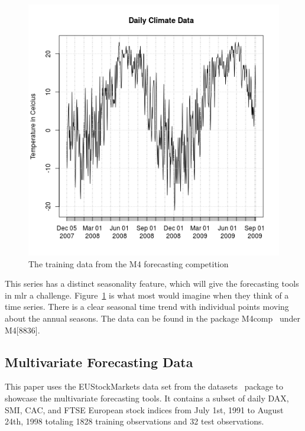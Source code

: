 \documentclass[12pt]{article}\usepackage[]{graphicx}\usepackage[]{color}
\makeatletter
\theoremstyle{definition}
\newcommand\code{\@codex}
\def\@codex#1{{\normalfont\ttfamily\hyphenchar\font=-1 #1}}
\newcommand{\pkg}[1]{{\fontseries{b}\selectfont #1}}
\makeatother
\begin{document}
\begin{figure}[h!]
\includegraphics[width=.8\linewidth]{plot_m4_train.png}
\centering
\caption{The training data from the M4 forecasting competition}
\label{fig:m4_train}
\end{figure}
\doublespacing

This series has a distinct seasonality feature, which will give the forecasting tools in \pkg{mlr} a challenge. Figure~\ref{fig:m4_train} is what most would imagine when they think of a time series. There is a clear seasonal time trend with individual points moving about the annual seasons. The data can be found in the package \pkg{M4comp}~\cite{m4comp} under \code{M4[8836]}.

\subsection{Multivariate Forecasting Data}
This paper uses the EUStockMarkets data set from the \pkg{datasets}~\cite{datasets} package to showcase the multivariate forecasting tools. It contains a subset of daily DAX, SMI, CAC, and FTSE European stock indices from July 1st, 1991 to August 24th, 1998 totaling 1828 training observations and 32 test observations.
\end{document}
